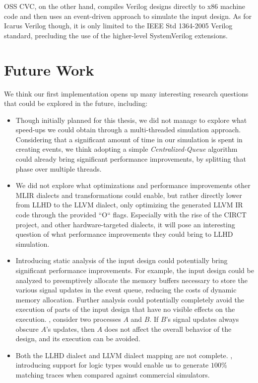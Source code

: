 OSS CVC, on the other hand, compiles Verilog designs directly to x86 machine code and then uses an event-driven approach to simulate the input design. As for Icarus Verilog though, it is only limited to the IEEE Std 1364-2005 Verilog standard, precluding the use of the higher-level SystemVerilog extensions.


\section{Future Work}
We think our first implementation opens up many interesting research questions that could be explored in the future, including:

\begin{itemize}
  \item Though initially planned for this thesis, we did not manage to explore what speed-ups we could obtain through a multi-threaded simulation approach. Considering that a significant amount of time in our simulation is spent in creating events, we think adopting a simple  \textit{Centralized-Queue} algorithm \cite{Ashenden1994} could already bring significant performance improvements, by splitting that phase over multiple threads.
  \item We did not explore what optimizations and performance improvements other MLIR dialects and transformations could enable, but rather directly lower from LLHD to the LLVM dialect, only optimizing the generated LLVM IR code through the provided “O“ flags. Especially with the rise of the CIRCT project, and other hardware-targeted dialects, it will pose an interesting question of what performance improvements they could bring to LLHD simulation.
  \item Introducing static analysis of the input design could potentially bring significant performance improvements. For example, the input design could be analyzed to preemptively allocate the memory buffers necessary to store the various signal updates in the event queue, reducing the costs of dynamic memory allocation. Further analysis could potentially completely avoid the execution of parts of the input design that have no visible effects on the execution. \Eg, consider two processes $A$ and $B$. If $B$'s signal updates always obscure $A$'s updates, then $A$ does not affect the overall behavior of the design, and its execution can be avoided.
  \item Both the LLHD dialect and LLVM dialect mapping are not complete. \Eg, introducing support for logic types would enable us to generate $100\%$ matching traces when compared against commercial simulators.

\end{itemize}
